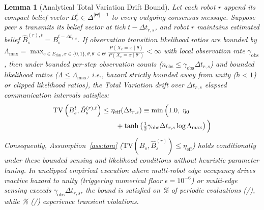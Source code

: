 \documentclass[lettersize,journal]{IEEEtran}
\newtheorem{lemma}{Lemma}
\begin{document}
\begin{lemma}[Analytical Total Variation Drift Bound]
Let each robot $r$ append its compact belief vector $B_r^t \in \Delta^{|\Theta|-1}$ to every outgoing consensus message. Suppose peer $s$ transmits its belief vector at tick $t - \Delta t_{r,s}$, and robot $r$ maintains estimated belief $\hat{B}_s^{(r),t} = B_s^{t - \Delta t_{r,s}}$. If observation transition likelihood ratios are bounded by $\Lambda_{\max} = \max_{e \in E_{\text{risk}}, x \in \{0,1\}, \theta, \theta' \in \Theta} \frac{P(X_e = x \mid \theta)}{P(X_e = x \mid \theta')} < \infty$ with local observation rate $\gamma_{\text{obs}}$, then under bounded per-step observation counts ($n_{\text{obs}} \le \gamma_{\text{obs}} \Delta t_{r,s}$) and bounded likelihood ratios ($\Lambda \le \Lambda_{\max}$, i.e., hazard strictly bounded away from unity ($h < 1$) or clipped likelihood ratios), the Total Variation drift over $\Delta t_{r,s}$ elapsed communication intervals satisfies:
\begin{align}
    \mathrm{TV}\left(B_s^t, \hat{B}_s^{(r),t}\right) &\le \eta_{\text{eff}}(\Delta t_{r,s}) \equiv \min\Big(1.0,\; \eta_0 \notag \\
    &\quad\quad + \tanh\left(\tfrac{1}{2} \gamma_{\text{obs}} \Delta t_{r,s} \log \Lambda_{\max}\right)\Big)
\label{eq:analytical_tv_drift}
\end{align}
Consequently, Assumption~\ref{ass:tom} ($\mathrm{TV}(B_s, \hat{B}_s^{(r)}) \le \eta_{\text{eff}}$) holds conditionally under these bounded sensing and likelihood conditions without heuristic parameter tuning. In unclipped empirical execution where multi-robot edge occupancy drives reactive hazard to unity (triggering numerical floor $\epsilon = 10^{-6}$) or multi-edge sensing exceeds $\gamma_{\text{obs}}\Delta t_{r,s}$, the bound is satisfied on \aeTvAdherencePct\% of periodic evaluations (\aeAdheredTvObservations/\aeTotalTvObservations), while \aeTvViolationPct\% (\aeViolatedTvObservations/\aeTotalTvObservations) experience transient violations.
\label{lem:tv_drift}
\end{lemma}
\end{document}
